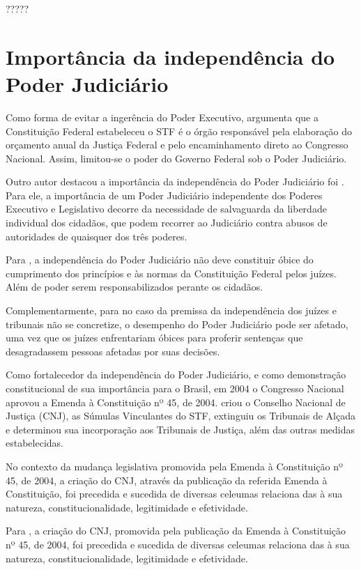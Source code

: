 ?????

\section{Importância da independência do Poder Judiciário}

Como forma de evitar a ingerência do Poder Executivo, \cite{pires2021paradoxo} argumenta que a Constituição Federal estabeleceu o STF é o órgão responsável pela elaboração do orçamento anual da Justiça Federal e pelo encaminhamento direto ao Congresso Nacional. Assim, limitou-se o poder do Governo Federal sob o Poder Judiciário. 

Outro autor destacou a importância da independência do Poder Judiciário foi \cite{akutsu2012dimensoes}. Para ele, a importância de um Poder Judiciário independente dos Poderes Executivo e Legislativo decorre da necessidade de salvaguarda da liberdade individual dos cidadãos, que podem recorrer ao Judiciário contra abusos de autoridades de quaisquer dos três poderes. 

Para \cite{akutsu2012dimensoes}, a independência do Poder Judiciário não deve constituir óbice do cumprimento dos princípios e às normas da Constituição Federal pelos juízes. Além de poder serem responsabilizados perante os cidadãos. 

Complementarmente, para \cite{akutsu2012dimensoes} no caso da premissa da independência dos juízes e tribunais não se concretize, o desempenho do Poder Judiciário pode ser afetado, uma vez que os juízes enfrentariam óbices para  proferir sentenças que desagradassem pessoas afetadas por suas decisões.

Como fortalecedor da independência do Poder Judiciário, e como demonstração constitucional de sua importância para o Brasil, em 2004 o Congresso Nacional aprovou a Emenda à Constituição nº 45, de 2004. \cite{ec45_2004} criou o Conselho Nacional de Justiça (CNJ), as Súmulas Vinculantes do STF, extinguiu os Tribunais de Alçada e determinou sua incorporação aos Tribunais de Justiça, além das outras medidas estabelecidas.

No contexto da mudança legislativa promovida pela  Emenda à Constituição nº 45, de 2004, a criação do CNJ, através da publicação da referida Emenda à Constituição, foi precedida e sucedida de diversas celeumas relaciona das à sua natureza, constitucionalidade, legitimidade e efetividade.

Para \cite{silva2013transparencia}, a criação do CNJ, promovida pela publicação da Emenda à Constituição nº 45, de 2004, foi precedida e sucedida de diversas celeumas relaciona das à sua natureza, constitucionalidade, legitimidade e efetividade.  

